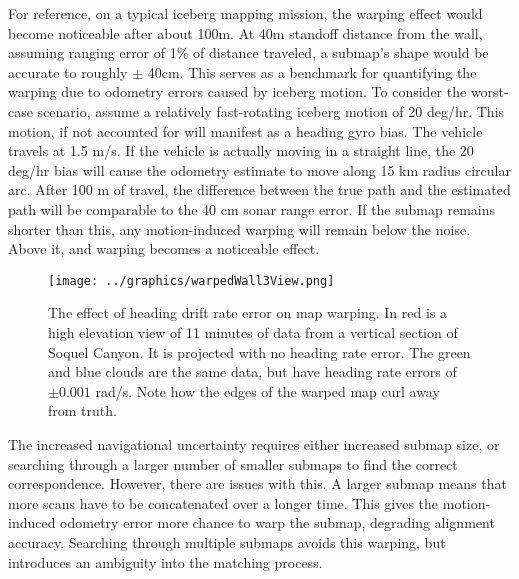 For reference, on a typical iceberg mapping mission, the warping effect would become noticeable after about 100m. At 40m standoff distance from the wall, assuming ranging error of 1\% of distance traveled, a submap's shape would be accurate to roughly $\pm$ 40cm. This serves as a benchmark for quantifying the warping due to odometry errors caused by iceberg motion. To consider the worst-case scenario, assume a relatively fast-rotating iceberg motion of 20 deg/hr. This motion, if not accounted for will manifest as a heading gyro bias. The vehicle travels at 1.5 m/s. If the vehicle is actually moving in a straight line, the 20 deg/hr bias will cause the odometry estimate to move along 15 km radius circular arc. After 100 m of travel, the difference between the true path and the estimated path will be comparable to the 40 cm sonar range error. If the submap remains shorter than this, any motion-induced warping will remain below the noise. Above it, and warping becomes a noticeable effect.



 \begin{figure}[htb]
   \centering
   \texttt{[image: ../graphics/warpedWall3View.png]} %
   \caption{The effect of heading drift rate error on map warping. In red is a high elevation view of 11 minutes of data from a vertical section of Soquel Canyon. It is projected with no heading rate error. The green and blue clouds are the same data, but have heading rate errors of $\pm0.001$ rad/s. Note how the edges of the warped map curl away from truth.}
   \label{fig:motionErrorWarping}
\end{figure}

The increased navigational uncertainty requires either increased submap size, or searching through a larger number of smaller submaps to find the correct correspondence. However, there are issues with this. A larger submap means that more scans have to be concatenated over a longer time. This gives the motion-induced odometry error more chance to warp the submap, degrading alignment accuracy. Searching through multiple submaps avoids this warping, but introduces an ambiguity into the matching process. 

